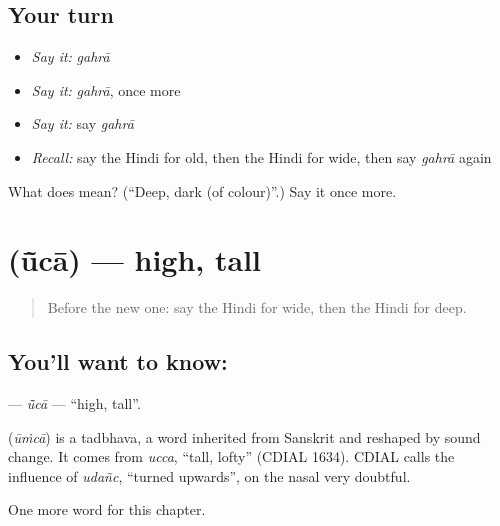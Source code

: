 \subsection*{Your turn}
\begin{itemize}
\raggedright
  \item \emph{Say it:} \emph{gahrā}
  \item \emph{Say it:} \emph{gahrā}, once more
  \item \emph{Say it:} say \emph{gahrā}
  \item \emph{Recall:} say the Hindi for old, then the Hindi for wide, then say \emph{gahrā} again
\end{itemize}

\begin{tcolorbox}[breakable,colback=teal!4,colframe=teal!35!black,title={Before you move on}]
What does  mean? (\textquotedblleft{}Deep, dark (of colour)\textquotedblright{}.) Say it once more.
\end{tcolorbox}
\section[\texorpdfstring{\hi{ऊँचा} (ū̃cā)}{ऊँचा (ū̃cā)}]{ (ū̃cā) — high, tall}

\label{lesson:HI-C158-uca}



\begin{quote}
Before the new one: say the Hindi for wide, then the Hindi for deep.
\end{quote}

\subsection*{You'll want to know: }
\textbf{} — \emph{ū̃cā} — \textquotedblleft{}high, tall\textquotedblright{}.

\begin{cousinweb}
\textbf{} (\emph{ūṁcā}) is a tadbhava, a word inherited from Sanskrit and reshaped by sound change. It comes from \emph{ucca}, \textquotedblleft{}tall, lofty\textquotedblright{} (CDIAL 1634). CDIAL calls the influence of \emph{udañc}, \textquotedblleft{}turned upwards\textquotedblright{}, on the nasal very doubtful.
\end{cousinweb}

\begin{grammarlens}[title={What you've built}]
One more word for this chapter.
\end{grammarlens}

